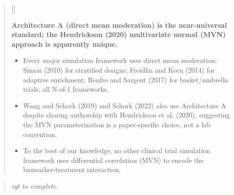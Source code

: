 \documentclass[
  11pt,
]{article}
\newcounter{pgraph}
\newenvironment{bullets}{%
  \stepcounter{pgraph}%
  \begin{quote}\small\sffamily\color[gray]{0.30}%
  {\normalfont\scriptsize\color[gray]{0.58}[\thepgraph]\enspace}}{%
  \end{quote}}
\newenvironment{rgt}{%
  \begin{quote}\small\itshape\color[RGB]{20,60,160}}{%
  \end{quote}}
\begin{document}
\begin{bullets}

\textbf{Architecture A (direct mean moderation) is the
near-universal standard; the Hendrickson (2020) multivariate
normal (MVN) approach is apparently unique.}

\begin{itemize}\setlength{\itemsep}{2pt}\setlength{\parskip}{0pt}
\item Every major simulation framework uses direct mean
  moderation: Simon (2010) for stratified designs; Freidlin and
  Korn (2014) for adaptive enrichment; Renfro and Sargent
  (2017) for basket/umbrella trials; all N-of-1 frameworks.
\item Wang and Schork (2019) and Schork (2022) also use
  Architecture A despite sharing authorship with Hendrickson
  et al. (2020), suggesting the MVN parameterization is a
  paper-specific choice, not a lab convention.
\item To the best of our knowledge, no other clinical trial
  simulation framework uses differential correlation (MVN) to
  encode the biomarker-treatment interaction.
\end{itemize}

\end{bullets}

\begin{rgt}
rgt to complete.

\end{rgt}
\end{document}
